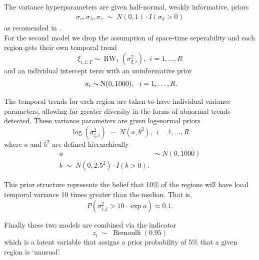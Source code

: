 \documentclass[11pt]{report}
\begin{document}
The variance hyperparameters are given half-normal, weakly informative, priors
\begin{gather}
\sigma_v, \sigma_\lambda, \sigma_\gamma \; \sim \; N(0, 1) \cdot I(\sigma_k > 0)
\end{gather}
as recomended in \citet{gelman2006prior}. \\

For the second model we drop the assumption of space-time seperability and each region gets their own temporal trend
\begin{equation*}
\xi_{i, 1:T} \sim \operatorname{RW}_1(\sigma_{\xi, i}^2), \ \ i=1,\ldots, R 
\end{equation*}
and an individual intercept term with an uninformative prior
\begin{equation*}
\ u_i \sim \operatorname{N}(0, 1000), \ \  i=1,\ldots, R. \\
\end{equation*}

The temporal trends for each region are taken to have individual variance parameters, allowing for greater diversity in the forms of abnormal trends detected. These variance parameters are given log-normal priors
\begin{equation*}
\log(\sigma_{\xi, i}^2) \; \sim \; N(a, b^2), \ \ i=1,\ldots,R
\end{equation*}
where $a$ and $b^2$ are defined hierarchically
\begin{align*}
a \; &\sim \; N(0, 1000) \\
b \; \sim \; N(0, 2.5^2) \cdot I(b > 0).
\end{align*}

This prior structure represents the belief that 10\% of the regions will have local temporal variance 10 times greater than the median. That is,
\begin{equation*}
P(\sigma_{i, \xi}^2 > 10\cdot\exp{a}) \approx 0.1.
\end{equation*} 

Finally these two models are combined via the indicator
\begin{equation}
z_i \; \sim \; \operatorname{Bernoulli}(0.95)
\end{equation}
which is a latent variable that assigns a prior probability of 5\% that a given region is `unusual'. \\
\end{document}
